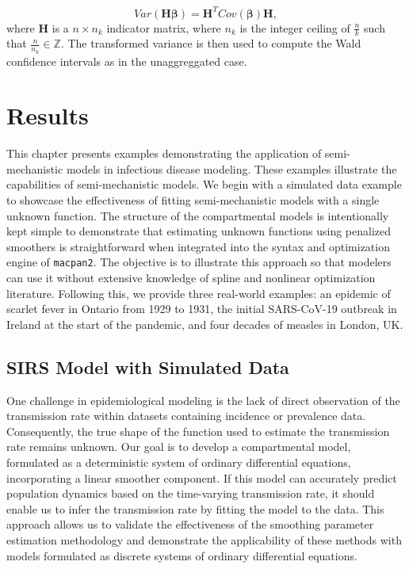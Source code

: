 \documentclass[
11pt, %
oneside, %
english, %
singlespacing, %
]{macthesis} %
\begin{document}
\[
Var(\mathbf{H} \boldsymbol{\beta}) = \mathbf{H}^T Cov(\boldsymbol{\beta}) \mathbf{H},
\]
where \(\mathbf{H}\) is a \(n \times n_k\) indicator matrix, where \(n_k\) is the integer ceiling of \(\frac{n}{k}\) such that \(\frac{n}{n_k} \in \mathbb{Z}\). The transformed variance is then used to compute the Wald confidence intervals as in the unaggreggated case.

\chapter{Results}\label{Results}

This chapter presents examples demonstrating the application of semi-mechanistic models in infectious disease modeling. These examples illustrate the capabilities of semi-mechanistic models. We begin with a simulated data example to showcase the effectiveness of fitting semi-mechanistic models with a single unknown function. The structure of the compartmental models is intentionally kept simple to demonstrate that estimating unknown functions using penalized smoothers is straightforward when integrated into the syntax and optimization engine of \texttt{macpan2}. The objective is to illustrate this approach so that modelers can use it without extensive knowledge of spline and nonlinear optimization literature. Following this, we provide three real-world examples: an epidemic of scarlet fever in Ontario from 1929 to 1931, the initial SARS-CoV-19 outbreak in Ireland at the start of the pandemic, and four decades of measles in London, UK.

\section{SIRS Model with Simulated Data}\label{simulation}

One challenge in epidemiological modeling is the lack of direct observation of the transmission rate within datasets containing incidence or prevalence data. Consequently, the true shape of the function used to estimate the transmission rate remains unknown. Our goal is to develop a compartmental model, formulated as a deterministic system of ordinary differential equations, incorporating a linear smoother component. If this model can accurately predict population dynamics based on the time-varying transmission rate, it should enable us to infer the transmission rate by fitting the model to the data. This approach allows us to validate the effectiveness of the smoothing parameter estimation methodology and demonstrate the applicability of these methods with models formulated as discrete systems of ordinary differential equations.
\end{document}
